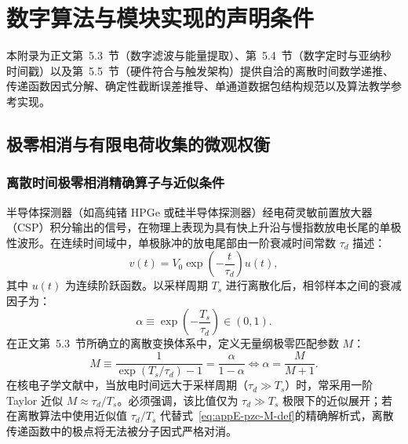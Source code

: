 \chapter{数字算法与模块实现的声明条件}\label{app:digital-algorithms}

本附录为正文第~5.3~节（数字滤波与能量提取）、第~5.4~节（数字定时与亚纳秒时间戳）以及第~5.5~节（硬件符合与触发架构）提供自洽的离散时间数学递推、传递函数因式分解、确定性截断误差推导、单通道数据包结构规范以及算法教学参考实现。

\section{极零相消与有限电荷收集的微观权衡}\label{sec:appE-pzc}

\subsection{离散时间极零相消精确算子与近似条件}

半导体探测器（如高纯锗 HPGe 或硅半导体探测器）经电荷灵敏前置放大器（CSP）积分输出的信号，在物理上表现为具有快上升沿与慢指数放电长尾的单极性波形。在连续时间域中，单极脉冲的放电尾部由一阶衰减时间常数 $\tau_d$ 描述：
\begin{equation}\label{eq:appE-preamp-decay}
v(t) = V_0 \exp\left(-\frac{t}{\tau_d}\right) u(t),
\end{equation}
其中 $u(t)$ 为连续阶跃函数。以采样周期 $T_s$ 进行离散化后，相邻样本之间的衰减因子为：
\begin{equation}\label{eq:appE-discrete-pole-factor}
\alpha \equiv \exp\left(-\frac{T_s}{\tau_d}\right) \in (0, 1).
\end{equation}
在正文第~5.3~节所确立的离散变换体系中，定义无量纲极零匹配参数 $M$：
\begin{equation}\label{eq:appE-pzc-M-def}
M \equiv \frac{1}{\exp(T_s/\tau_d) - 1} = \frac{\alpha}{1 - \alpha} \iff \alpha = \frac{M}{M + 1}.
\end{equation}
在核电子学文献中，当放电时间远大于采样周期（$\tau_d \gg T_s$）时，常采用一阶 Taylor 近似 $M \approx \tau_d / T_s$。必须强调，该比值仅为 $\tau_d \gg T_s$ 极限下的近似展开；若在离散算法中使用近似值 $\tau_d / T_s$ 代替式~\eqref{eq:appE-pzc-M-def}的精确解析式，离散传递函数中的极点将无法被分子因式严格对消。

